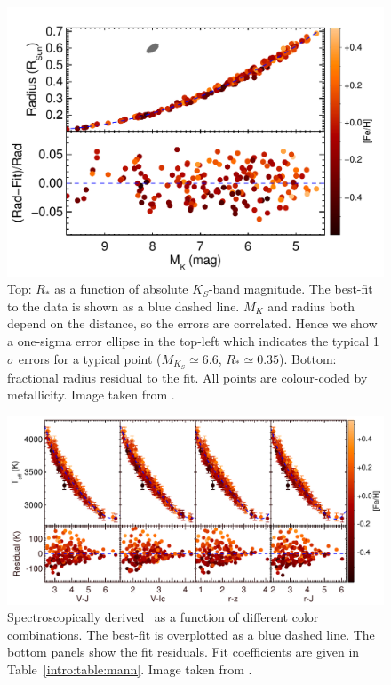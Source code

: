 \begin{figure}
    \centering
    \includegraphics[width=\textwidth]{3-images/f7.pdf}
    \caption{Top: $R_*$ as a function of absolute $K_S$-band magnitude. The best-fit to the data is shown as a blue dashed line. $M_{K}$ and radius both depend on the distance, so the errors are correlated. Hence we show a one-sigma error ellipse in the top-left which indicates the typical 1$\sigma$ errors for a typical point ($M_{K_S}\simeq6.6$, $R_*\simeq0.35$). Bottom: fractional radius residual to the fit. All points are colour-coded by metallicity. Image taken from \protect\citet{2015ApJ...804...64M}. }
    \label{intro:fig:Mann1}
\end{figure}


\begin{figure}
    \centering
    \includegraphics[width=\textwidth]{3-images/f10.pdf}
    \caption{Spectroscopically derived \teff\ as a function of different color combinations. The best-fit is overplotted as a blue dashed line. The bottom panels show the fit residuals. Fit coefficients are given in Table~\ref{intro:table:mann}. Image taken from \protect\citet{2015ApJ...804...64M}.}
    \label{intro:fig:Mann2}
\end{figure}

